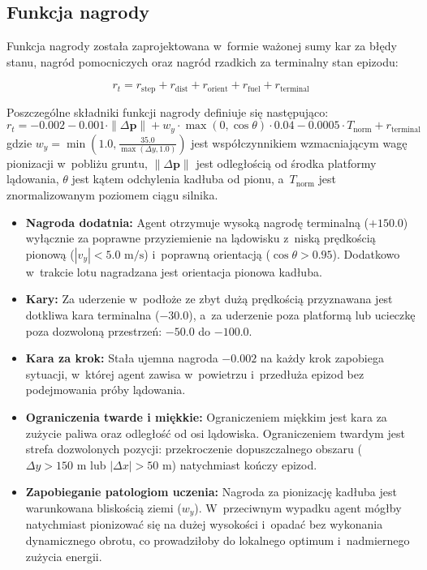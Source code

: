 \documentclass[12pt]{article}
\begin{document}
\subsection{Funkcja nagrody}

Funkcja nagrody została zaprojektowana w~formie ważonej sumy kar za błędy stanu, nagród pomocniczych oraz nagród rzadkich za terminalny stan epizodu:

\begin{equation}
    r_t = r_{\text{step}} + r_{\text{dist}} + r_{\text{orient}} + r_{\text{fuel}} + r_{\text{terminal}}
\end{equation}

Poszczególne składniki funkcji nagrody definiuje się następująco:
\begin{equation}
    r_t = -0.002 - 0.001 \cdot \|\Delta \mathbf{p}\| + w_y \cdot \max(0, \cos\theta) \cdot 0.04 - 0.0005 \cdot T_{\text{norm}} + r_{\text{terminal}}
\end{equation}
gdzie $w_y = \min\left(1.0, \frac{35.0}{\max(\Delta y, 1.0)}\right)$ jest współczynnikiem wzmacniającym wagę pionizacji w~pobliżu gruntu, $\|\Delta \mathbf{p}\|$ jest odległością od środka platformy lądowania, $\theta$ jest kątem odchylenia kadłuba od pionu, a~$T_{\text{norm}}$ jest znormalizowanym poziomem ciągu silnika.

\begin{itemize}
    \item \textbf{Nagroda dodatnia:} Agent otrzymuje wysoką nagrodę terminalną ($+150.0$) wyłącznie za poprawne przyziemienie na lądowisku z~niską prędkością pionową ($|v_y| < 5.0\text{ m/s}$) i~poprawną orientacją ($\cos\theta > 0.95$). Dodatkowo w~trakcie lotu nagradzana jest orientacja pionowa kadłuba.
    \item \textbf{Kary:} Za uderzenie w~podłoże ze zbyt dużą prędkością przyznawana jest dotkliwa kara terminalna ($-30.0$), a~za uderzenie poza platformą lub ucieczkę poza dozwoloną przestrzeń: $-50.0$ do $-100.0$.
    \item \textbf{Kara za krok:} Stała ujemna nagroda $-0.002$ na każdy krok zapobiega sytuacji, w~której agent zawisa w~powietrzu i~przedłuża epizod bez podejmowania próby lądowania.
    \item \textbf{Ograniczenia twarde i miękkie:} Ograniczeniem miękkim jest kara za zużycie paliwa oraz odległość od osi lądowiska. Ograniczeniem twardym jest strefa dozwolonych pozycji: przekroczenie dopuszczalnego obszaru ($\Delta y > 150\text{ m}$ lub $|\Delta x| > 50\text{ m}$) natychmiast kończy epizod.
    \item \textbf{Zapobieganie patologiom uczenia:} Nagroda za pionizację kadłuba jest warunkowana bliskością ziemi ($w_y$). W~przeciwnym wypadku agent mógłby natychmiast pionizować się na dużej wysokości i~opadać bez wykonania dynamicznego obrotu, co prowadziłoby do lokalnego optimum i~nadmiernego zużycia energii.
\end{itemize}
\end{document}
